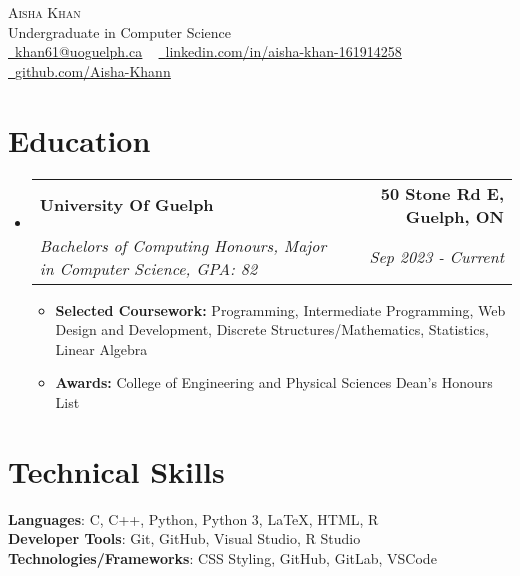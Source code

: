 \documentclass[letterpaper,11pt]{article}
\makeatletter
\newcommand{\resumeItem}[1]{
  \item\small{
    {#1 \vspace{-3pt}}
  }
}
\newcommand{\resumeSubheading}[4]{
  \vspace{-3pt}\item
    \begin{tabular*}{1.0\textwidth}[t]{l@{\extracolsep{\fill}}r}
      \textbf{#1} & \textbf{\small #2} \\
      \textit{\small#3} & \textit{\small #4} \\
    \end{tabular*}\vspace{-7pt}
}
\newcommand{\resumeSubHeadingListStart}{\begin{itemize}[leftmargin=0.0in, label={}]}
\newcommand{\resumeSubHeadingListEnd}{\end{itemize}}
\newcommand{\resumeItemListStart}{\begin{itemize}}
\newcommand{\resumeItemListEnd}{\end{itemize}\vspace{0pt}}
\makeatother
\begin{document}
    \begin{center}
        {\Huge\scshape Aisha Khan} 
        \\ Undergraduate in Computer Science\\
        \small
        \href{mailto:EMAIL}{\raisebox{-0.2\height}\faEnvelope\  \underline{khan61@uoguelph.ca}} ~ 
        \href{LINK}{\raisebox{-0.2\height}\faLinkedin\ \underline{linkedin.com/in/aisha-khan-161914258}}  ~
        \href{LINK}{\raisebox{-0.2\height}\faGithub\ \underline{github.com/Aisha-Khann}}
    \end{center}

\section{Education}
  \resumeSubHeadingListStart
  
    \resumeSubheading
    {University Of Guelph}{50 Stone Rd E, Guelph, ON}
    {Bachelors of Computing Honours, Major in Computer Science, GPA: 82}{Sep 2023 - Current}
        \resumeItemListStart
            \resumeItem{\textbf{Selected Coursework:} Programming, Intermediate Programming, Web Design and Development, Discrete Structures/Mathematics, Statistics, Linear Algebra}
            \resumeItem{\textbf{Awards:} College of Engineering and Physical Sciences Dean's Honours List }
        \resumeItemListEnd
        
  \resumeSubHeadingListEnd

\section{Technical Skills}

    \vspace{-7pt}
    \begin{itemize}
    [leftmargin=0.15in, label={}]\small{\item{
        \textbf{Languages}{: C, C++, Python, Python 3, LaTeX, HTML, R} \\
        \textbf{Developer Tools}{: Git, GitHub, Visual Studio, R Studio} \\
        \textbf{Technologies/Frameworks}{: CSS Styling, GitHub, GitLab, VSCode} \\}}
    \end{itemize}
 
\end{document}
